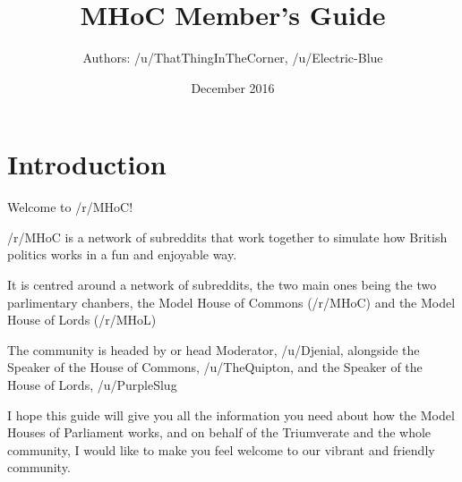 \documentclass{article}
\title{MHoC Member's Guide}
\author{Authors: /u/ThatThingInTheCorner, /u/Electric-Blue}
\date{December 2016}
\begin{document}
\maketitle

\section{Introduction}
Welcome to /r/MHoC!

/r/MHoC is a network of subreddits that work together to simulate how British politics works in a fun and enjoyable way.

It is centred around a network of subreddits, the two main ones being the two parlimentary chanbers, the Model House of Commons (/r/MHoC) and the Model House of Lords (/r/MHoL)

The community is headed by or head Moderator, /u/Djenial, alongside the Speaker of the House of Commons, /u/TheQuipton, and the Speaker of the House of Lords, /u/PurpleSlug

I hope this guide will give you all the information you need about how the Model Houses of Parliament works, and on behalf of the Triumverate and the whole community, I would like to make you feel welcome to our vibrant and friendly community.
\end{document}
